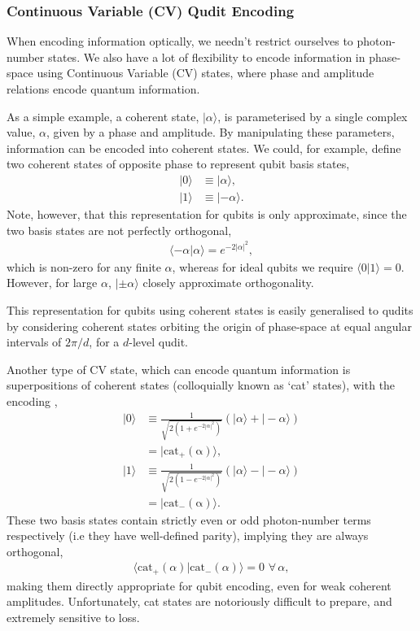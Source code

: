 \documentclass[aps,rmp,twocolumn,amsmath,amssymb,nofootinbib,superscriptaddress]{revtex4}
\newcommand{\ket}[1]{|#1\rangle}
\begin{document}
%
%

\subsubsection{Continuous Variable (CV) Qudit Encoding} \label{sec:CV_enc}

When encoding information optically, we needn't restrict ourselves to photon-number states. We also have a lot of flexibility to encode information in phase-space using Continuous Variable (CV) states, where phase and amplitude relations encode quantum information.

As a simple example, a coherent state, $\ket\alpha$, is parameterised by a single complex value, $\alpha$, given by a phase and amplitude. By manipulating these parameters, information can be encoded into coherent states. We could, for example, define two coherent states of opposite phase to represent qubit basis states,
\begin{align}
\ket{0} &\equiv \ket{\alpha}, \nonumber \\
\ket{1} &\equiv \ket{-\alpha}.
\end{align}
Note, however, that this representation for qubits is only approximate, since the two basis states are not perfectly orthogonal,
\begin{align}
\langle -\alpha|\alpha \rangle = e^{-2|\alpha|^2},
\end{align}
which is non-zero for any finite $\alpha$, whereas for ideal qubits we require \mbox{$\langle 0|1\rangle = 0$}. However, for large $\alpha$, $\ket{\pm\alpha}$ closely approximate orthogonality.

This representation for qubits using coherent states is easily generalised to qudits by considering coherent states orbiting the origin of phase-space at equal angular intervals of \mbox{$2\pi/d$}, for a $d$-level qudit.

Another type of CV state, which can encode quantum information is superpositions of coherent states (colloquially known as `cat' states), with the encoding \cite{???},
\begin{align}
\ket{0} &\equiv \frac{1}{\sqrt{2(1+e^{-2|\alpha|^2})}} (\ket{\alpha}+\ket{-\alpha}) \nonumber \\
&= \ket{\mathrm{cat_+(\alpha)}},\nonumber \\
\ket{1} &\equiv \frac{1}{\sqrt{2(1-e^{-2|\alpha|^2})}}(\ket{\alpha}-\ket{-\alpha}) \nonumber \\
&= \ket{\mathrm{cat_-(\alpha)}}.
\end{align}
These two basis states contain strictly even or odd photon-number terms respectively (i.e they have well-defined parity), implying they are always orthogonal,
\begin{align}
\langle\mathrm{cat}_+(\alpha)|\mathrm{cat}_-(\alpha)\rangle = 0 \,\,\forall\,\alpha,
\end{align}
making them directly appropriate for qubit encoding, even for weak coherent amplitudes. Unfortunately, cat states are notoriously difficult to prepare, and extremely sensitive to loss.
\end{document}
